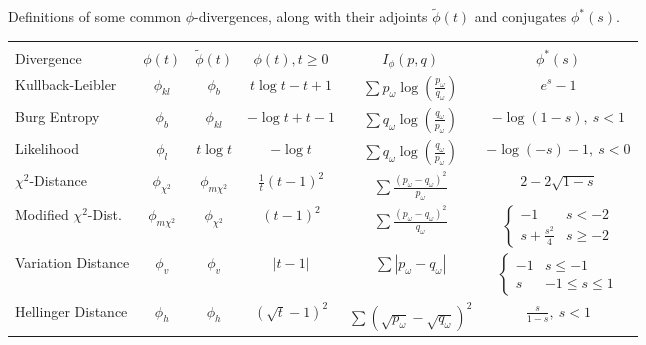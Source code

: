 \documentclass[ijoc,letterpaper]{informs3} %
\begin{document}
\begin{table}
	\TABLE
	{
		Definitions of some common $\phi$-divergences, along with their adjoints $\tilde{\phi}(t)$ and conjugates $\phi^*(s)$.
		\label{tb:phi_definitions}
	}
	{\begin{tabular}{lccccc}
		\hline \\
		Divergence                        & $\phi(t)$          & $\tilde{\phi}(t)$               & $\phi(t), t \geq 0$   & $I_\phi(p,q)$     & $\phi^*(s)$ \\
		\hline
		Kullback-Leibler                  & $\phi_{kl}$        & $\phi_b$                        & $t\log t - t + 1$     & $\sum p_\omega \log\left(\frac{p_\omega}{q_\omega}\right)$ & $e^s - 1$ \\
		Burg Entropy                      & $\phi_b$           & $\phi_{kl}$                     & $-\log t + t - 1$     & $\sum q_\omega \log\left(\frac{q_\omega}{p_\omega}\right)$ & $-\log(1-s),\ s < 1$  \\
		Likelihood                        & $\phi_l$           & $t\log t $                      & $-\log t$             & $\sum q_\omega \log\left(\frac{q_\omega}{p_\omega}\right)$ & $-\log(-s) - 1,\ s < 0$ \\
		$\chi^2$-Distance                 & $\phi_{\chi^2}$    & $\phi_{m\chi^2}$                & $\frac{1}{t} (t-1)^2$ & $\sum \frac{(p_\omega-q_\omega)^2}{p_\omega}$              & $2 - 2\sqrt{1-s}$  \\
		Modified $\chi^2$-Dist.           & $\phi_{m\chi^2}$   & $\phi_{\chi^2}$                 & $(t-1)^2$             & $\sum \frac{(p_\omega - q_\omega)^2}{q_\omega}$            & $\begin{cases} -1 & s < -2 \\ s + \frac{s^2}{4} & s \geq -2 \end{cases}$ \\
		Variation Distance                & $\phi_v$           & $\phi_v$                        & $|t-1|$               & $\sum |p_\omega - q_\omega|$                               & $\begin{cases} -1 & s \leq -1 \\ s & -1 \leq s \leq 1 \end{cases}$ \\
		Hellinger Distance                & $\phi_h$           & $\phi_h$                        & $(\sqrt{t} - 1)^2$    & $\sum (\sqrt{p_\omega} - \sqrt{q_\omega})^2$               & $\frac{s}{1-s},\ s < 1$ \\
	\hline
	\end{tabular}}
	{}
\end{table}
\end{document}

